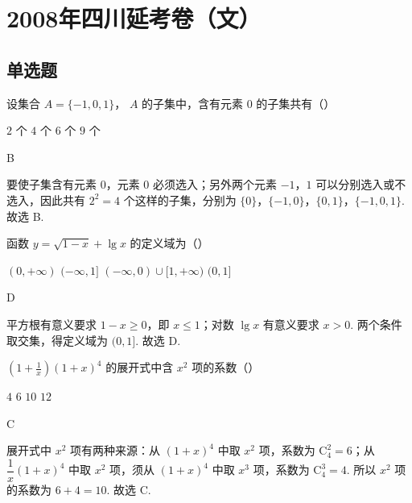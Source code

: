 \chapter{2008年四川延考卷（文）}
\section{单选题}

\begin{problem}
设集合 \( A = \{-1, 0, 1\} \)， \(A\) 的子集中，含有元素 \(0\) 的子集共有（\quad）

\choices
    {\(2\) 个}
    {\(4\) 个}
    {\(6\) 个}
    {\(9\) 个}
\end{problem}

\begin{answer}
B
\end{answer}

\begin{solution}
要使子集含有元素 \(0\)，元素 \(0\) 必须选入；另外两个元素 \(-1\)，\(1\) 可以分别选入或不选入，因此共有 \(2^2=4\) 个这样的子集，分别为 \(\{0\}\)，\(\{-1,0\}\)，\(\{0,1\}\)，\(\{-1,0,1\}\). 故选 B.
\end{solution}

\begin{problem}
函数 \( y=\sqrt{1-x}+\lg x \) 的定义域为（\quad）

\choices
    {\( (0,+\infty) \)}
    {\( (-\infty,1] \)}
    {\( (-\infty,0)\cup[1,+\infty) \)}
    {\( (0,1] \)}
\end{problem}

\begin{answer}
D
\end{answer}

\begin{solution}
平方根有意义要求 \(1-x\geq 0\)，即 \(x\leq 1\)；对数 \(\lg x\) 有意义要求 \(x>0\). 两个条件取交集，得定义域为 \((0,1]\). 故选 D.
\end{solution}

\begin{problem}
\( \left(1+\frac{1}{x}\right)\left(1+x\right)^{4} \) 的展开式中含 \( x^{2} \) 项的系数（\quad）

\choices
    {\(4\)}
    {\(6\)}
    {\(10\)}
    {\(12\)}
\end{problem}

\begin{answer}
C
\end{answer}

\begin{solution}
展开式中 \(x^2\) 项有两种来源：从 \((1+x)^4\) 中取 \(x^2\) 项，系数为 \(\mathrm C_4^2=6\)；从 \(\dfrac{1}{x}(1+x)^4\) 中取 \(x^2\) 项，须从 \((1+x)^4\) 中取 \(x^3\) 项，系数为 \(\mathrm C_4^3=4\). 所以 \(x^2\) 项的系数为 \(6+4=10\). 故选 C.
\end{solution}

